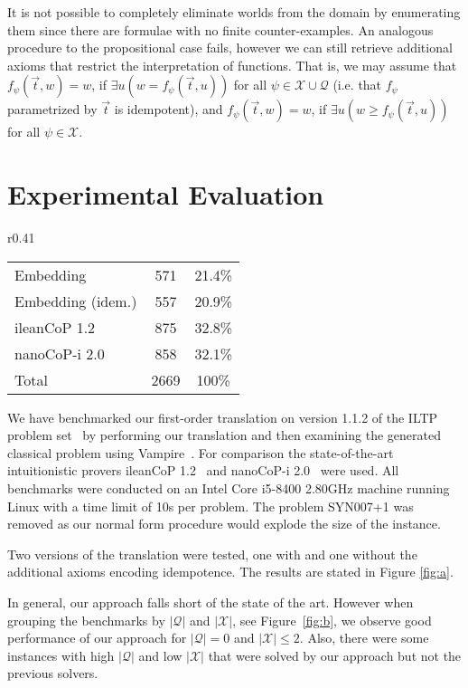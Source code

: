 \documentclass{easychair}
\theoremstyle{definition}
\theoremstyle{definition}
\theoremstyle{definition}
\theoremstyle{definition}
\theoremstyle{definition}
\theoremstyle{definition}
\theoremstyle{definition}
\begin{document}
It is not possible to completely eliminate worlds from the domain by enumerating them since there are formulae with no finite counter-examples. An analogous procedure to the propositional case fails, however we can still retrieve additional axioms that restrict the interpretation of functions. That is, we may assume that $f_\psi(\vec t, w) = w$, if $\exists u(w = f_\psi(\vec t, u))$ for all $\psi\in\mathcal X\cup\mathcal Q$ (i.e. that $f_\psi$ parametrized by $\vec t$ is idempotent), and $f_\psi(\vec t, w) = w$, if $\exists u(w \geq f_\psi(\vec t, u))$ for all $\psi\in\mathcal X$.

\section{Experimental Evaluation}
\label{sec:evaluation}

\begin{wrapfigure}[5]{r}{0.41\textwidth}
	\vspace*{-1.6cm}
	\begin{tabular}{l|c|c}
		Embedding&571&21.4\%\\
		Embedding (idem.)&557&20.9\%\\
		ileanCoP 1.2&875&32.8\%\\
		nanoCoP-i 2.0&858&32.1\%\\\hline
		Total&2669&100\%
	\end{tabular}
	\caption{Solved problems.}
	\label{fig:a}
\end{wrapfigure}

We have benchmarked our first-order translation on version 1.1.2 of the ILTP problem set~\cite{iltp} by performing our translation and then examining the generated classical problem using Vampire~\cite{kovacs2013first}.
For comparison the state-of-the-art intuitionistic provers ileanCoP 1.2~\cite{otten2008leancop} and nanoCoP-i 2.0~\cite{otten2021nanocop} were used. All benchmarks were conducted on an Intel Core i5-8400 2.80GHz machine running Linux with a time limit of 10s per problem. The problem \textsc{SYN007+1} was removed as our normal form procedure would explode the size of the instance.

Two versions of the translation were tested, one with and one without the additional axioms encoding idempotence. The results are stated in Figure \ref{fig:a}.

In general, our approach falls short of the state of the art. 
However when grouping the benchmarks by $|\mathcal Q|$ and $|\mathcal X|$, see Figure~\ref{fig:b},
we observe good performance of our approach for $|\mathcal Q| = 0$ and $|\mathcal X| \leq 2$. Also, there were some instances with high $|\mathcal Q|$ and low $|\mathcal X|$ that were solved by our approach but not the previous solvers.
\end{document}
